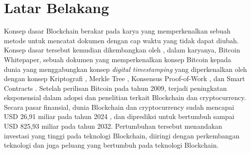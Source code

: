 \section{Latar Belakang}
\label{sec:latarbelakang}

Konsep dasar Blockchain berakar pada karya \cite{haber1991time} yang memperkenalkan sebuah metode untuk mencatat dokumen dengan cap waktu yang tidak dapat diubah. Konsep dasar tersebut kemudian dikembangkan oleh \cite{nakamoto2008bitcoin}, dalam karyanya, Bitcoin Whitepaper, sebuah dokumen yang memperkenalkan konsep Bitcoin kepada dunia yang menggabungkan konsep \textit{digital timestamping} yang diperkenalkan oleh \cite{haber1991time} dengan konsep Kriptografi \parencite{hellman1976new} \parencite{standard1995secure}, Merkle Tree \parencite{merkle1987digital}, Konsensus Proof-of-Work \parencite{dwork1992pricing}, dan Smart Contracts \parencite{szabo1997formalizing}. Setelah perilisan Bitcoin pada tahun 2009, terjadi peningkatan eksponensial dalam adopsi dan penelitian terkait Blockchain dan cryptocurrency. Secara pasar finansial, dunia Blockchain dan cryptocurrency sudah mencapai USD 26,91 miliar pada tahun 2024 \parencite{rosencrance2024top}, dan diprediksi untuk bertumbuh sampai USD 825,93 miliar pada tahun 2032. Pertumbuhan tersebut menandakan investasi yang tinggi pada teknologi Blockchain, diiringi dengan perkembangan teknologi dan juga peluang yang bertumbuh pada teknologi Blockchain. 


